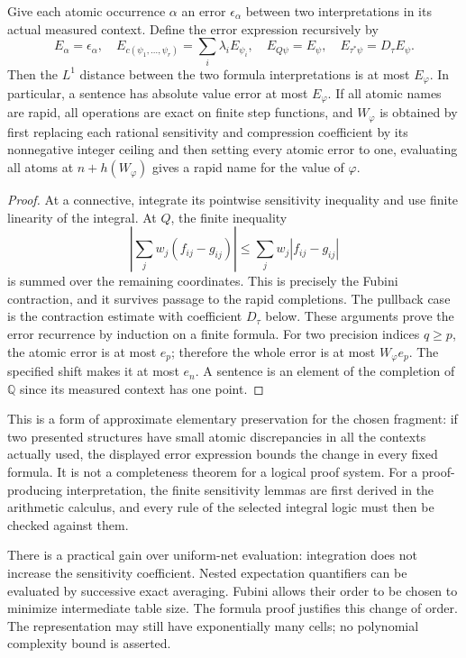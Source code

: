 \begin{theorem}
\label{ct:formula}
Give each atomic occurrence $\alpha$ an error $\epsilon_\alpha$ between
two interpretations in its actual measured context. Define the error
expression recursively by
\[
 E_\alpha=\epsilon_\alpha,\quad
 E_{c(\psi_1,\ldots,\psi_r)}=\sum_i\lambda_iE_{\psi_i},\quad
 E_{Q\psi}=E_\psi,\quad E_{\tau^*\psi}=D_\tau E_\psi.
\]
Then the $L^1$ distance between the two formula interpretations is at most
$E_\varphi$. In particular, a sentence has absolute value error at most
$E_\varphi$. If all atomic names are rapid, all operations are exact on
finite step functions, and $W_\varphi$ is obtained by first replacing each rational sensitivity
and compression coefficient by its nonnegative integer ceiling and then
setting every atomic error to one, evaluating all atoms at
$n+h(W_\varphi)$ gives a rapid name for the value of $\varphi$.
\end{theorem}
\begin{proof}
At a connective, integrate its pointwise sensitivity inequality and use
finite linearity of the integral. At $Q$, the finite inequality
\[
 \left|\sum_j w_j(f_{ij}-g_{ij})\right|
 \leq\sum_jw_j|f_{ij}-g_{ij}|
\]
is summed over the remaining coordinates. This is precisely the Fubini
contraction, and it survives passage to the rapid completions. The pullback
case is the contraction estimate with coefficient $D_\tau$ below. These
arguments prove the error recurrence by induction on a finite formula.
For two precision indices $q\geq p$, the atomic error is at most $e_p$;
therefore the whole error is at most $W_\varphi e_p$. The specified shift
makes it at most $e_n$. A sentence is an element of the completion of
$\mathbb Q$ since its measured context has one point.\end{proof}

This is a form of approximate elementary preservation for the chosen
fragment: if two presented structures have small atomic discrepancies in
all the contexts actually used, the displayed error expression bounds the
change in every fixed formula. It is not a completeness theorem for a
logical proof system. For a proof-producing interpretation, the finite
sensitivity lemmas are first derived in the arithmetic calculus, and every
rule of the selected integral logic must then be checked against them.

There is a practical gain over uniform-net evaluation: integration does not
increase the sensitivity coefficient. Nested expectation quantifiers can
be evaluated by successive exact averaging. Fubini allows their order to
be chosen to minimize intermediate table size. The formula proof justifies
this change of order. The representation may still have exponentially
many cells; no polynomial complexity bound is asserted.

